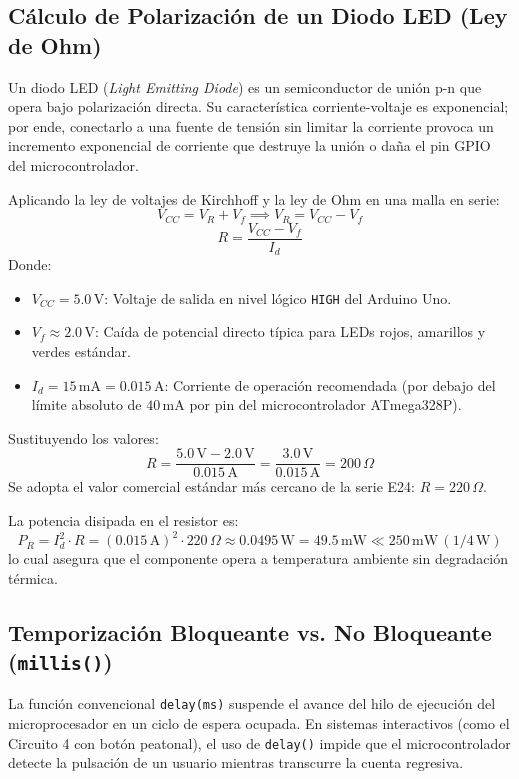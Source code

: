 \documentclass[12pt,a4paper]{article}
\begin{document}
\subsection{Cálculo de Polarización de un Diodo LED (Ley de Ohm)}
Un diodo LED (\textit{Light Emitting Diode}) es un semiconductor de unión p-n que opera bajo polarización directa. Su característica corriente-voltaje es exponencial; por ende, conectarlo a una fuente de tensión sin limitar la corriente provoca un incremento exponencial de corriente que destruye la unión o daña el pin GPIO del microcontrolador.

Aplicando la ley de voltajes de Kirchhoff y la ley de Ohm en una malla en serie:
\begin{equation}
    V_{CC} = V_R + V_f \implies V_R = V_{CC} - V_f
\end{equation}
\begin{equation}
    R = \frac{V_{CC} - V_f}{I_d}
\end{equation}
Donde:
\begin{itemize}[noitemsep]
    \item $V_{CC} = 5.0\,\text{V}$: Voltaje de salida en nivel lógico \texttt{HIGH} del Arduino Uno.
    \item $V_f \approx 2.0\,\text{V}$: Caída de potencial directo típica para LEDs rojos, amarillos y verdes estándar.
    \item $I_d = 15\,\text{mA} = 0.015\,\text{A}$: Corriente de operación recomendada (por debajo del límite absoluto de $40\,\text{mA}$ por pin del microcontrolador ATmega328P).
\end{itemize}

Sustituyendo los valores:
\begin{equation}
    R = \frac{5.0\,\text{V} - 2.0\,\text{V}}{0.015\,\text{A}} = \frac{3.0\,\text{V}}{0.015\,\text{A}} = 200\,\Omega
\end{equation}
Se adopta el valor comercial estándar más cercano de la serie E24: \textbf{$R = 220\,\Omega$}.

La potencia disipada en el resistor es:
\begin{equation}
    P_R = I_d^2 \cdot R = (0.015\,\text{A})^2 \cdot 220\,\Omega \approx 0.0495\,\text{W} = 49.5\,\text{mW} \ll 250\,\text{mW}\,(1/4\,\text{W})
\end{equation}
lo cual asegura que el componente opera a temperatura ambiente sin degradación térmica.

\subsection{Temporización Bloqueante vs. No Bloqueante (\texttt{millis()})}
La función convencional \texttt{delay(ms)} suspende el avance del hilo de ejecución del microprocesador en un ciclo de espera ocupada. En sistemas interactivos (como el Circuito 4 con botón peatonal), el uso de \texttt{delay()} impide que el microcontrolador detecte la pulsación de un usuario mientras transcurre la cuenta regresiva.
\end{document}

